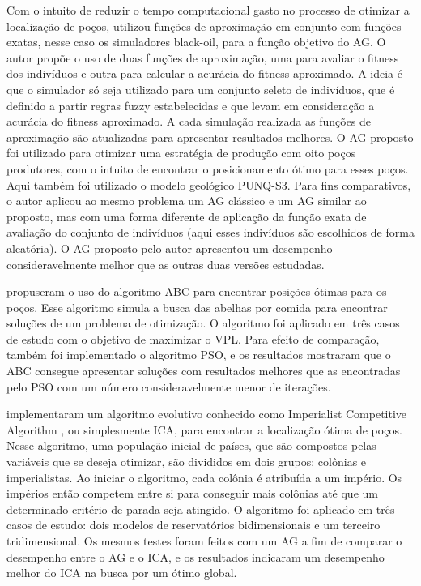 Com o intuito de reduzir o tempo computacional gasto no processo de otimizar a localização de poços,  utilizou funções de aproximação em conjunto com funções exatas, nesse caso os simuladores black-oil, para a função objetivo do AG. O autor propõe o uso de duas funções de aproximação, uma para avaliar o fitness dos indivíduos e outra para calcular a acurácia do fitness aproximado. A ideia é que o simulador só seja utilizado para um conjunto seleto de indivíduos, que é definido a partir regras fuzzy estabelecidas e que levam em consideração a acurácia do fitness aproximado. A cada simulação realizada as funções de aproximação são atualizadas para apresentar resultados melhores. O AG proposto foi utilizado para otimizar uma estratégia de produção com oito poços produtores, com o intuito de encontrar o posicionamento ótimo para esses poços. Aqui também foi utilizado o modelo geológico PUNQ-S3. Para fins comparativos, o autor aplicou ao mesmo problema um AG clássico e um AG similar ao proposto, mas com uma forma diferente de aplicação da função exata de avaliação do conjunto de indivíduos (aqui esses indivíduos são escolhidos de forma aleatória). O AG proposto pelo autor apresentou um desempenho consideravelmente melhor que as outras duas versões estudadas.

 propuseram o uso do algoritmo ABC para encontrar posições ótimas para os poços. Esse algoritmo simula a busca das abelhas por comida para encontrar soluções de um problema de otimização. O algoritmo foi aplicado em três casos de estudo com o objetivo de maximizar o VPL. Para efeito de comparação, também foi implementado o algoritmo PSO, e os resultados mostraram que o ABC consegue apresentar soluções com resultados melhores que as encontradas pelo PSO com um número consideravelmente menor de iterações.

 implementaram um algoritmo evolutivo conhecido como Imperialist Competitive Algorithm \cite{AtashpazGargari2007}, ou simplesmente ICA, para encontrar a localização ótima de poços. Nesse algoritmo, uma população inicial de países, que são compostos pelas variáveis que se deseja otimizar, são divididos em dois grupos: colônias e imperialistas. Ao iniciar o algoritmo, cada colônia é atribuída a um império. Os impérios então competem entre si para conseguir mais colônias até que um determinado critério de parada seja atingido. O algoritmo foi aplicado em três casos de estudo: dois modelos de reservatórios bidimensionais e um terceiro tridimensional. Os mesmos testes foram feitos com um AG a fim de comparar o desempenho entre o AG e o ICA, e os resultados indicaram um desempenho melhor do ICA na busca por um ótimo global.

